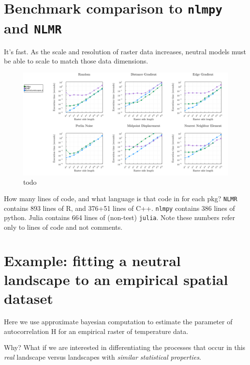 \documentclass[11pt]{article}
\makeatletter
\def\maxwidth{\ifdim\Gin@nat@width>\linewidth\linewidth
\else\Gin@nat@width\fi}
\let\Oldincludegraphics\includegraphics
\renewcommand{\includegraphics}[1]{\Oldincludegraphics[width=\maxwidth]{#1}}
\makeatother
\begin{document}
\hypertarget{benchmark-comparison-to-nlmpy-and-nlmr}{%
\section{\texorpdfstring{Benchmark comparison to \texttt{nlmpy} and
\texttt{NLMR}}{Benchmark comparison to nlmpy and NLMR}}\label{benchmark-comparison-to-nlmpy-and-nlmr}}

It's fast. As the scale and resolution of raster data increases, neutral
models must be able to scale to match those data dimensions.

\begin{figure}
\centering
\includegraphics{./figures/benchmark.png}
\caption{todo}
\end{figure}

How many lines of code, and what language is that code in for each pkg?
\texttt{NLMR} contains 893 lines of R, and 376+51 lines of C++.
\texttt{nlmpy} contains 386 lines of python. Julia contains 664 lines of
(non-test) \texttt{julia}. Note these numbers refer only to lines of
code and not comments.

\hypertarget{example-fitting-a-neutral-landscape-to-an-empirical-spatial-dataset}{%
\section{Example: fitting a neutral landscape to an empirical spatial
dataset}\label{example-fitting-a-neutral-landscape-to-an-empirical-spatial-dataset}}

Here we use approximate bayesian computation to estimate the parameter
of autocorrelation H for an empirical raster of temperature data.

Why? What if we are interested in differentiating the processes that
occur in this \emph{real} landscape versus landscapes with \emph{similar
statistical properties}.
\end{document}

